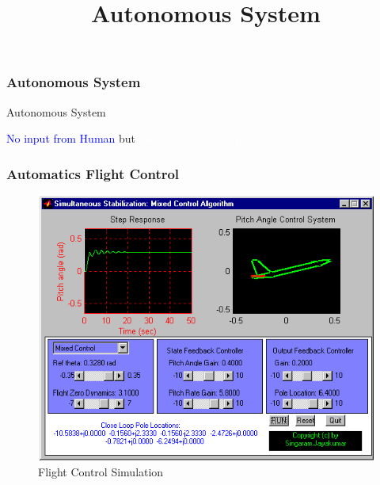 



\title[Systems Engineering]{Autonomous System} 


\begin{frame}
\frametitle{Autonomous System }
\begin{block}{Autonomous System}

 \vspace{1cm}
  

 \colorbox{gray!35}{ \textcolor{blue}{ No input from Human } } but 
  \colorbox{blue!47}{ \textcolor{white}{  disturbances might present } }

  \vspace{1cm}
  


\end{block}
\end{frame}



\newpage


\begin{frame}
\frametitle{Automatics Flight Control }
\begin{figure}
\includegraphics[scale=0.4]{pic/mcls1.png}
\caption{ Flight Control Simulation }
\label{Layer1}
\end{figure}
\end{frame}

\newpage

\newcommand{\symbolA}{
	\tikz \draw[red] (0,0)--(0,0.2)--(0.2,0.2)--(0.2,0.4)--(0.4,0.4);
}

\newcommand{\symbolB}{
	\tikz[y={(0,-1)}] \draw[blue] (0,0)--(0,0.2)--(0.2,0.2)--(0.2,0.4)--(0.4,0.4);
}

